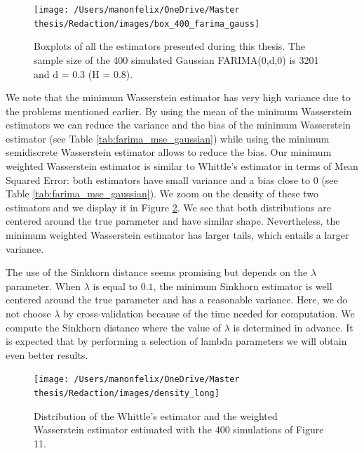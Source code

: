 \documentclass[
  11pt,
]{article}
\begin{document}
\begin{figure}

{\centering \texttt{[image: /Users/manonfelix/OneDrive/Master thesis/Redaction/images/box\_400\_farima\_gauss]} 

}

\caption{Boxplots of all the estimators presented during this thesis. The sample size of the 400 simulated Gaussian FARIMA(0,d,0) is 3201 and d = 0.3 (H = 0.8).}\label{fig:box_farima_400}
\end{figure}

We note that the minimum Wasserstein estimator has very high variance
due to the problems mentioned earlier. By using the mean of the minimum
Wasserstein estimators we can reduce the variance and the bias of the
minimum Wasserstein estimator (see Table \ref{tab:farima_mse_gaussian})
while using the minimum semidiscrete Wasserstein estimator allows to
reduce the bias. Our minimum weighted Wasserstein estimator is similar
to Whittle's estimator in terms of Mean Squared Error: both estimators
have small variance and a bias close to \(0\) (see Table
\ref{tab:farima_mse_gaussian}). We zoom on the density of these two
estimators and we display it in Figure \ref{fig:density_long_gauss}. We
see that both distributions are centered around the true parameter and
have similar shape. Nevertheless, the minimum weighted Wasserstein
estimator has larger tails, which entails a larger variance.

The use of the Sinkhorn distance seems promising but depends on the
\(\lambda\) parameter. When \(\lambda\) is equal to \(0.1\), the minimum
Sinkhorn estimator is well centered around the true parameter and has a
reasonable variance. Here, we do not choose \(\lambda\) by
cross-validation because of the time needed for computation. We compute
the Sinkhorn distance where the value of \(\lambda\) is determined in
advance. It is expected that by performing a selection of lambda
parameters we will obtain even better results.

\begin{figure}

{\centering \texttt{[image: /Users/manonfelix/OneDrive/Master thesis/Redaction/images/density\_long]} 

}

\caption{Distribution of the Whittle's estimator and the weighted Wasserstein estimator estimated with the 400 simulations of Figure 11.}\label{fig:density_long_gauss}
\end{figure}
\end{document}
